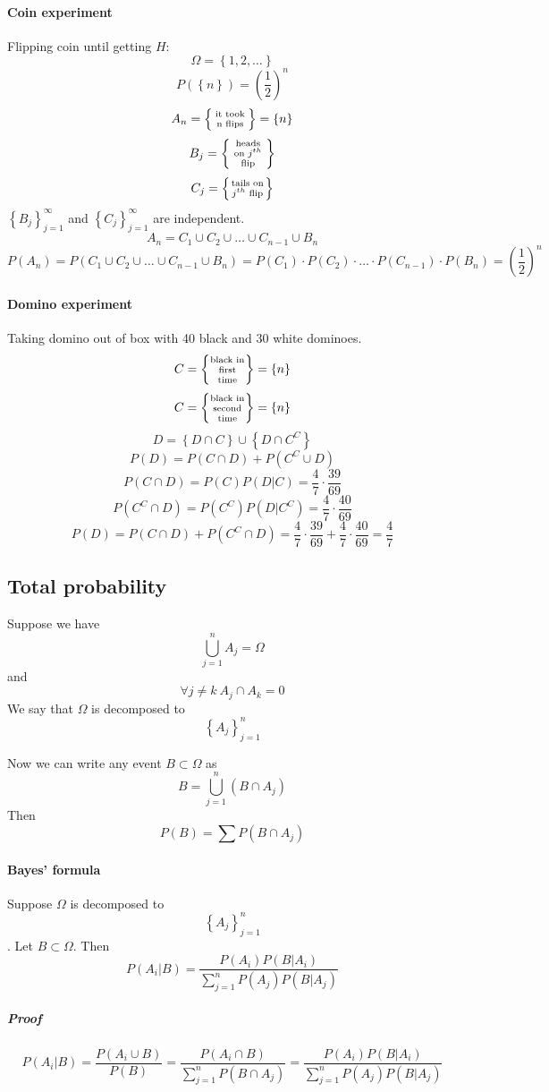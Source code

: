 \paragraph{Coin experiment} Flipping coin until getting $H$:
$$\Omega = \left\{ 1,2,\dots \right\}$$
$$P(\left\{ n \right\}) = \left( \frac{1}{2} \right)^n$$
$$A_n = \left\{ \parbox{1cm}{\centering \scriptsize it took n flips } \right\} = \left\{ n \right\}$$
$$B_j = \left\{  \parbox{1cm}{\centering \scriptsize heads on $j^{th}$ flip } \right\}$$
$$C_j = \left\{  \parbox{1cm}{\centering \scriptsize tails on $j^{th}$ flip } \right\}$$
$\left\{ B_j \right\}_{j=1}^{\infty}$ and $\left\{ C_j \right\}_{j=1}^{\infty}$ are independent.
$$A_n = C_1 \cup C_2 \cup \dots \cup C_{n-1} \cup B_n$$
$$P(A_n) = P\left(C_1 \cup C_2 \cup \dots \cup C_{n-1} \cup B_n \right) = P(C_1) \cdot P(C_2) \cdot \dots \cdot P(C_{n-1}) \cdot P(B_n) = \left( \frac{1}{2} \right)^n$$
\paragraph{Domino experiment} Taking domino out of box with 40 black and 30 white dominoes.
$$C = \left\{ \parbox{1cm}{\centering \scriptsize black in first time } \right\} = \left\{ n \right\}$$
$$C = \left\{ \parbox{1cm}{\centering \scriptsize black in second time } \right\} = \left\{ n \right\}$$
$$D = \left\{ D \cap C \right\} \cup \left\{ D \cap C^C \right\}$$
$$P(D) = P(C \cap D) + P(C^C \cup D)$$
$$P(C \cap D) = P(C) P(D | C) = \frac{4}{7} \cdot \frac{39}{69}$$
$$P(C^C \cap D) = P(C^C) P(D | C^C) = \frac{4}{7} \cdot \frac{40}{69}$$
$$P(D) = P(C \cap D) + P(C^C \cap D) = \frac{4}{7} \cdot \frac{39}{69} +\frac{4}{7} \cdot \frac{40}{69} = \frac{4}{7} $$
\subsection{Total probability}
Suppose we have $$\bigcup_{j=1}^n A_j = \Omega$$ and $$\forall j \neq k \: A_j \cap A_k = 0$$
We say that $\Omega$ is decomposed to $$\left\{ A_j \right\}_{j=1}^n$$

Now we can write any event $B \subset \Omega$ as $$B = \bigcup_{j=1}^n \left(B \cap A_j\right) $$
Then $$P(B) = \sum P\left(B \cap A_j\right)  $$

\paragraph{Bayes' formula} 
Suppose $\Omega$ is decomposed to $$\left\{ A_j \right\}_{j=1}^n$$. Let $B\subset \Omega$. Then
$$P(A_i |B) = \frac{P(A_i)P(B|A_i)}{\sum_{j=1}^n P(A_j)P(B|A_j)}$$
\subparagraph{Proof}
$$P(A_i | B) = \frac{P(A_i \cup B)}{P(B)} = \frac{P(A_i \cap B)}{\sum_{j=1}^n P(B \cap A_j)} = \frac{P(A_i) P( B|A_i)}{\sum_{j=1}^n P(A_j) P( B|A_j)}  $$

